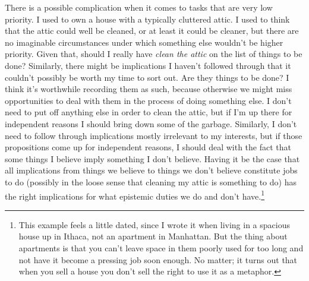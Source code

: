 There is a possible complication when it comes to tasks that are very low priority. I used to own a house with a typically cluttered attic. I used to think that the attic could well be cleaned, or at least it could be cleaner, but there are no imaginable circumstances under which something else wouldn't be higher priority. Given that, should I really have \textit{clean the attic} on the list of things to be done? Similarly, there might be implications I haven't followed through that it couldn't possibly be worth my time to sort out. Are they things to be done? I think it's worthwhile recording them as such, because otherwise we might miss opportunities to deal with them in the process of doing something else. I don't need to put off anything else in order to clean the attic, but if I'm up there for independent reasons I should bring down some of the garbage. Similarly, I don't need to follow through implications mostly irrelevant to my interests, but if those propositions come up for independent reasons, I should deal with the fact that some things I believe imply something I don't believe. Having it be the case that all implications from things we believe to things we don't believe constitute jobs to do (possibly in the loose sense that cleaning my attic is something to do) has the right implications for what epistemic duties we do and don't have.\footnote{This example feels a little dated, since I wrote it when living in a spacious house up in Ithaca, not an apartment in Manhattan. But the thing about apartments is that you can't leave space in them poorly used for too long and not have it become a pressing job soon enough. No matter; it turns out that when you sell a house you don't sell the right to use it as a metaphor.}

